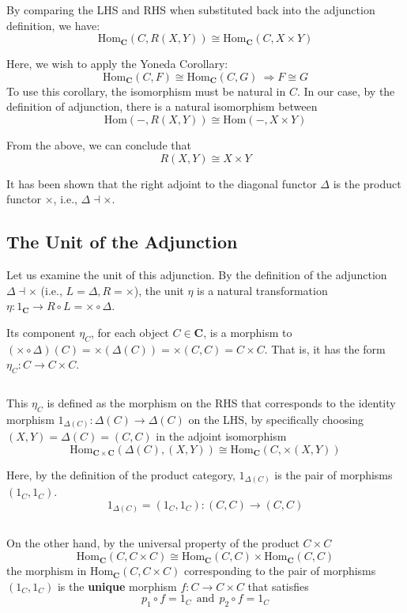 \documentclass[uplatex,a4j,12pt,dvipdfmx]{jsarticle}
\begin{document}
${}$

By comparing the LHS and RHS when substituted back into the adjunction definition, we have:
$$
	\mathrm{Hom}_{\mathbf{C}}(C, R(X,Y))
	\cong
	\mathrm{Hom}_{\mathbf{C}}(C, X \times Y)
$$

Here, we wish to apply the Yoneda Corollary:
$$
	\mathrm{Hom}_{\mathbf{C}}(C, F)
	\cong
	\mathrm{Hom}_{\mathbf{C}}(C, G)
	\ \Rightarrow
	F \cong G
$$
To use this corollary, the isomorphism must be natural in $C$.
In our case, by the definition of adjunction,
there is a natural isomorphism between
$$
	\mathrm{Hom}(-, R(X,Y))
	\cong
	\mathrm{Hom}(-, X \times Y)
$$

From the above, we can conclude that
$$
	R(X,Y)
	\cong
	X \times Y
$$

It has been shown that the right adjoint to the diagonal functor $\Delta$ is the product functor $\times$, i.e., $\Delta \dashv \times$.

\subsection{The Unit of the Adjunction}

Let us examine the unit of this adjunction.
By the definition of the adjunction $\Delta \dashv \times$ (i.e., $L=\Delta, R= \times$), the unit $\eta$ is a natural transformation
$\eta : 1_{\mathbf{C}} \to R \circ L = \times \circ \Delta$.

Its component $\eta_{C}$, for each object $C \in \mathbf{C}$,
is a morphism to $(\times \circ \Delta)(C) = \times (\Delta (C)) = \times (C,C) = C \times C$.
That is, it has the form $\eta_{C} : C \to C \times C$.

${}$

This $\eta_{C}$ is defined as the morphism on the RHS that corresponds to
the identity morphism $1_{\Delta(C)} : \Delta(C) \to \Delta(C)$ on the LHS,
by specifically choosing $(X,Y) = \Delta (C) = (C,C)$ in the adjoint isomorphism
$$
	\mathrm{Hom}_{\mathbf{C} \times \mathbf{C}}(\Delta(C), (X,Y)) \cong \mathrm{Hom}_{\mathbf{C}}(C, \times (X,Y))
$$

Here, by the definition of the product category,
$1_{\Delta(C)}$
is the pair of morphisms
$(1_{C}, 1_{C})$.
$$
	1_{\Delta(C)} = (1_{C}, 1_{C}) : (C,C) \to (C,C)
$$

${}$

On the other hand, by the universal property of the product $C \times C$
$$
	\mathrm{Hom}_{\mathbf{C}}(C, C \times C)
	\cong
	\mathrm{Hom}_{\mathbf{C}}(C, C)
	\times
	\mathrm{Hom}_{\mathbf{C}}(C, C)
$$
the morphism in $\mathrm{Hom}_{\mathbf{C}}(C, C \times C)$ corresponding to the
pair of morphisms
$(1_{C}, 1_{C})$
is the \textbf{unique} morphism $f: C \to C \times C$ that satisfies
$$
	p_{1} \circ f = 1_{C} \ \ \text{and} \ \ p_{2} \circ f = 1_{C}
$$
\end{document}
